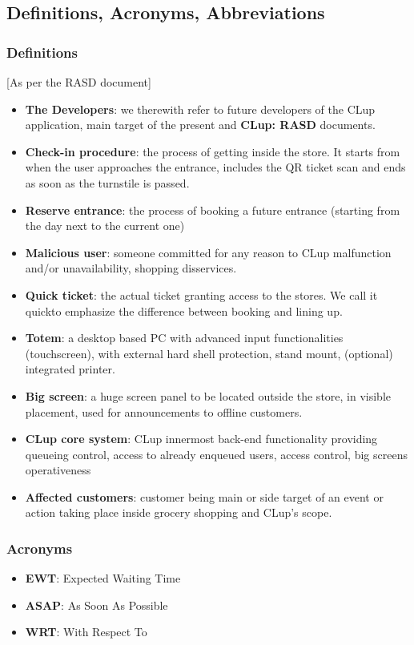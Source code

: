\subsection{Definitions, Acronyms, Abbreviations}
\subsubsection{Definitions\label{subsub:definitions}}
[As per the RASD document]\newline
\begin{itemize}
\item \textbf{The Developers}: we therewith refer to future developers of the CLup application, main target of the present and \textbf{CLup: RASD} documents.
\item \textbf{Check-in procedure}: the process of getting inside the store. It starts from when the user approaches the entrance, includes the QR ticket scan and ends as soon as the turnstile is passed.
\item \textbf{Reserve entrance}: the process of booking a future entrance (starting from the day next to the current one)
\item \textbf{Malicious user}: someone committed for any reason to CLup malfunction and/or unavailability, shopping disservices.
\item \textbf{Quick ticket}: the actual ticket granting access to the stores. We call it \guillemotleft quick\guillemotright \space to emphasize the difference between booking and lining up.
\item \textbf{Totem}: a desktop based PC with advanced input functionalities (touchscreen), with external hard shell protection, stand mount, (optional) integrated printer.
\item \textbf{Big screen}: a huge screen panel to be located outside the store, in visible placement, used for announcements to offline customers.
\item \textbf{CLup core system\label{core_functionality}}: CLup innermost back-end functionality providing queueing control, access to already enqueued users, access control, big screens operativeness
\item \textbf{Affected customers\label{affected:def}}: customer being main or side target of an event or action taking place inside grocery shopping and CLup's scope.
\end{itemize}
\subsubsection{Acronyms}
\begin{itemize}
\item \textbf{EWT}: Expected Waiting Time
\item \textbf{ASAP}: As Soon As Possible
\item \textbf{WRT}: With Respect To
\end{itemize}

